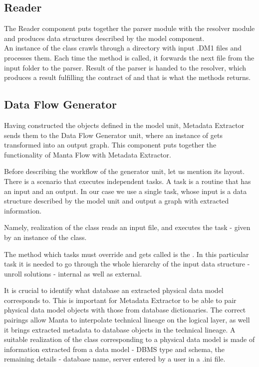 \subsection{Reader}

The Reader component puts together the parser module with the resolver module and produces data structures described by the model component. \\

An instance of the  class crawls through a directory with input .DM1 files and processes them. 
Each time the  method is called, it forwards the next file from the input folder to the parser. Result of the parser is handed to the resolver, which produces a result fulfilling the contract of  and that is what the  methods returns.

\subsection{Data Flow Generator}

Having constructed the objects defined in the model unit, Metadata Extractor sends them to the Data Flow Generator unit, where an instance of  gets transformed into an output graph. This component puts together the functionality of Manta Flow with Metadata Extractor.

Before describing the workflow of the generator unit, let us mention its layout.
There is a scenario that executes independent tasks. A task is a routine that has an input and an output. In our case we use a single task, whose input is a data structure described by the model unit and output a graph with extracted information.

Namely, realization of the class  reads an input file, and executes the task - given by an instance of the  class. 

The method which tasks must override and gets called is the . In this particular task it is needed to go through the whole hierarchy of the input data structure -  unroll solutions - internal as well as external.

It is crucial to identify what database an extracted physical data model corresponds to.
This is important for Metadata Extractor to be able to pair physical data model objects with those from database dictionaries. The correct pairings allow Manta to interpolate technical lineage on the logical layer, as well it brings extracted metadata to database objects in the technical lineage.
A suitable realization of the  class corresponding to a physical data model is made of information extracted from a data model - DBMS type and schema, the remaining details - database name, server entered by a user in a .ini file.

